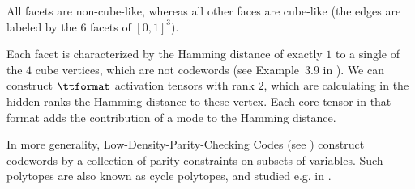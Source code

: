 \begin{example}
\begin{center}
    \end{center}

    All facets are non-cube-like, whereas all other faces are cube-like (the edges are labeled by the $6$ facets of $[0,1]^3$).

    Each facet is characterized by the Hamming distance of exactly $1$ to a single of the $4$ cube vertices, which are not codewords (see Example~3.9 in \cite{wainwright_graphical_2008}).
    We can construct $\ttformat$ activation tensors with rank $2$, which are calculating in the hidden ranks the Hamming distance to these vertex.
    Each core tensor in that format adds the contribution of a mode to the Hamming distance.

    In more generality, Low-Density-Parity-Checking Codes (see \cite{gallager_low-density_1963}) construct codewords by a collection of parity constraints on subsets of variables.
    Such polytopes are also known as cycle polytopes, and studied e.g. in \cite{grotschel_geometric_1993}.

\end{example}